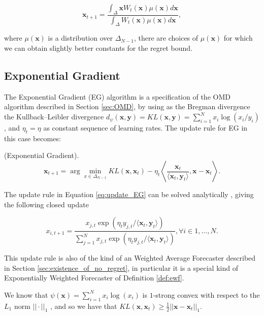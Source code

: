 \begin{equation}\label{eq:general_UP}
\mathbf x_{t+1}=\frac{\int_{\Delta}\mathbf x W_t(\mathbf x)\mu(\mathbf x)d\mathbf x}{\int_{\Delta} W_t(\mathbf x)\mu(\mathbf x)d\mathbf x},
\end{equation}

where $\mu(\mathbf x)$ is a distribution over $\Delta_{N-1}$, there are choices of $\mu(\mathbf x)$ for which we can obtain slightly better constants for the regret bound.


\subsection{Exponential Gradient}

The Exponential Gradient (EG) algorithm is a specification of the OMD algorithm described in Section \ref{sec:OMD}, by using as the Bregman divergence the Kullback–Leibler divergence $d_\psi(\mathbf x,\mathbf y)=KL(\mathbf x,\mathbf y)=\sum\limits_{i=1}^Nx_i\log(x_i/y_i)$, and $\eta_t=\eta$ as constant sequence of learning rates. The update rule for EG in this case becomes:

\begin{definition}(Exponential Gradient).
\begin{equation}\label{eq:update_EG}
\mathbf x_{t+1}=\arg\min\limits_{x\in\Delta_{N-1}} KL(\mathbf x,\mathbf x_t)-\eta_t\left\langle \frac{\mathbf x_t}{\langle \mathbf x_t,\mathbf y_t\rangle},\mathbf x-\mathbf x_t\right\rangle.
\end{equation}
\end{definition}

The update rule in Equation \eqref{eq:update_EG} can be solved analytically \cite{helmbold1998line}, giving the following closed update 

\begin{equation}\label{eq:update_EG_closed}
x_{i,t+1}=\frac{x_{j,t}\exp\left(\eta_t{y_{j,t}}/\langle\mathbf x_t,\mathbf y_t\rangle\right)}{\sum\limits_{j=1}^Nx_{j,t}\exp\left(\eta_t{y_{j,t}}/\langle\mathbf x_t,\mathbf y_t\rangle\right)}, \forall i\in1,\ldots,N.
\end{equation}

This update rule is also of the kind of an Weighted Average Forecaster described in Section \ref{sec:existence_of_no_regret}, in particular it is a special kind of Exponentially Weighted Forecaster of Definition \ref{def:ewf}.

We know that $\psi(\mathbf x)=\sum\limits_{i=1}^Nx_i\log(x_i)$ is $1$-strong convex with respect to the $L_1$ norm $||\cdot||_1$ \cite{shalev2007online}, and so we have that $KL(\mathbf x,\mathbf x_t)\ge\frac{1}{2}||\mathbf x-\mathbf x_t||_1$.


